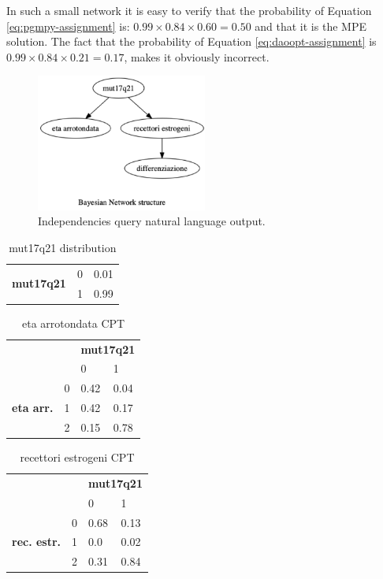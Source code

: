 In such a small network it is easy to verify that the probability of Equation \ref{eq:pgmpy-assignment} is: $0.99 \times 0.84 \times 0.60 = 0.50$ and that it is the MPE solution.
The fact that the probability of Equation \ref{eq:daoopt-assignment} is $0.99 \times 0.84 \times 0.21 = 0.17$, makes it obviously incorrect.

\begin{figure}[htbp]
\centerline{\includegraphics[width=0.5\textwidth]{results/images/issues-bn}}
\caption{Independencies query natural language output.}
\label{fig:issues-bn}
\end{figure}

\begin{table}[htbp]
\centering
\caption{mut17q21 distribution}
\begin{tabularx}{\textwidth/3}{ccX}
\toprule
 \multirow{2}{*}{\textbf{mut17q21}} & 0 & 0.01  \\
 & 1 & 0.99 \\
\bottomrule
\end{tabularx}
\label{tab:mut-cpd-issues}
\end{table}

\begin{table}[htbp]
\centering
\caption{eta arrotondata CPT}
\begin{tabularx}{0.5\textwidth}{ccXX}
\toprule
      & &  \multicolumn{2}{c}{\textbf{mut17q21}} \\
\cmidrule(lr){3-4}
 & & 0 & 1    \\ 
 \multirow{3}{*}{\textbf{eta arr.}}  & 0 & 0.42 & 0.04  \\
 & 1 & 0.42 & 0.17    \\
 & 2 & 0.15 & 0.78 \\
\bottomrule
\end{tabularx}
\label{tab:eta-cpd-issues}
\end{table}

\begin{table}[htbp]
\centering
\caption{recettori estrogeni CPT}
\begin{tabularx}{0.5\textwidth}{ccXX}
\toprule
      & &  \multicolumn{2}{c}{\textbf{mut17q21}} \\
\cmidrule(lr){3-4}
 & & 0 & 1    \\ 
 \multirow{3}{*}{\textbf{rec. estr.}}  & 0 & 0.68 & 0.13  \\
 & 1 & 0.0 & 0.02    \\
 & 2 & 0.31 & 0.84 \\
\bottomrule
\end{tabularx}
\label{tab:rec-cpd-issues}
\end{table}

